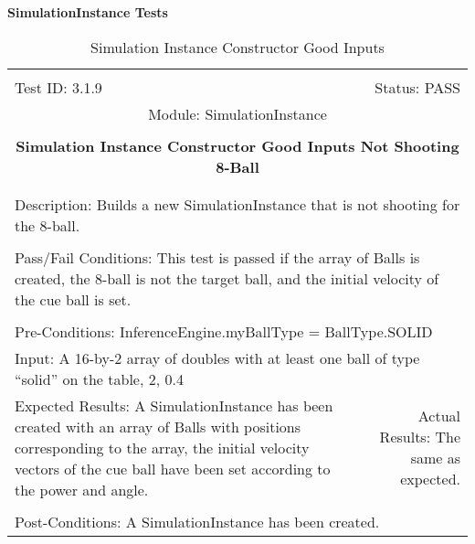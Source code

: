 \documentclass[titlepage]{article}
\begin{document}
\large{\textbf{SimulationInstance Tests}}
\begin{center}
\begin{table}[h!]
\begin{tabular}{|l r|}\hline&\\[-2mm]
	Test ID: 3.1.9	&Status: PASS\\[-3mm]
	\multicolumn{2}{|c|}{Module: SimulationInstance}\\&\\
	\multicolumn{2}{|c|}{\textbf{\large{Simulation Instance Constructor Good Inputs Not Shooting 8-Ball}}}\\&\\\hline&\\[-3mm]
	\multicolumn{2}{|p{\textwidth}|}{Description: Builds a new SimulationInstance that is not shooting for the 8-ball.}\\[1mm]\hline&\\[-3mm]
	\multicolumn{2}{|p{\textwidth}|}{Pass/Fail Conditions: This test is passed if the array of Balls is created, the 8-ball is not the target ball, and the initial velocity of the cue ball is set.}\\[1mm]\hline&\\[-3mm]
	\multicolumn{2}{|p{\textwidth}|}{Pre-Conditions: InferenceEngine.myBallType = BallType.SOLID}\\[4mm]
	\multicolumn{2}{|p{\textwidth}|}{Input: A 16-by-2 array of doubles with at least one ball of type ``solid'' on the table, 2, 0.4}\\[2mm]\hline
	\multicolumn{1}{|p{0.49\textwidth}}{Expected Results: A SimulationInstance has been created with an array of Balls with positions corresponding to the array, the initial velocity vectors of the cue ball have been set according to the power and angle.}	&\multicolumn{1}{|p{0.45\textwidth}|}{Actual Results: The same as expected.}\\\hline&\\[-3mm]
	\multicolumn{2}{|p{\textwidth}|}{Post-Conditions: A SimulationInstance has been created.}\\\hline
\end{tabular}
\caption{Simulation Instance Constructor Good Inputs}
\end{table}
\end{center}
\end{document}
